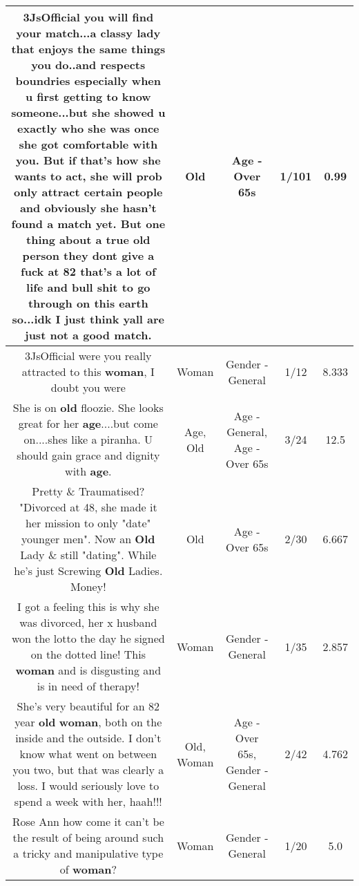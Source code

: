 \documentclass[11pt]{article}
\newlength\mylength
\begin{document}
\begin{center}
\begin{longtable}{|C{.65\mylength}|C{.30\mylength}|C{.12\mylength}|C{.12\mylength}|C{.12\mylength}|}
  \small \@3JsOfficial you will find your match...a classy lady that enjoys the same things you do..and respects boundries especially when u first getting to know someone...but she showed u exactly who she was once she got comfortable with you. But if that's how she wants to act, she will prob only attract certain people and obviously she hasn't found a match yet.  But one thing about a true \textbf{old} person they dont give a fuck at 82 that's a lot of life and bull shit to go through on this earth so...idk I just think yall are just not a good match.\normalsize   & Old & Age - Over 65s & 1/101 & 0.99 \\  \hline
  \small \@3JsOfficial were you really attracted to this \textbf{woman}, I doubt you were\normalsize   & Woman & Gender - General & 1/12 & 8.333 \\  \hline
  \small She is on \textbf{old} floozie.  She looks great for her \textbf{age}....but come on....shes like a piranha.  U should gain grace and dignity with \textbf{age}.\normalsize   & Age, Old & Age - General, Age - Over 65s & 3/24 & 12.5 \\  \hline
  \small Pretty \& Traumatised?  "Divorced at 48, she made it her mission to only "date" younger men". Now an \textbf{Old} Lady \& still "dating". While he's just Screwing \textbf{Old} Ladies. Money!\normalsize   & Old & Age - Over 65s & 2/30 & 6.667 \\  \hline
  \small I got a feeling this is why she was divorced, her x husband won the lotto the day he signed on the dotted line! This \textbf{woman} and is disgusting and is in need of therapy!\normalsize   & Woman & Gender - General & 1/35 & 2.857 \\  \hline
  \small She's very beautiful for an 82 year \textbf{old} \textbf{woman}, both on the inside and the outside. I don't know what went on between you two, but that was clearly a loss. I would seriously love to spend a week with her, haah!!!\normalsize   & Old, Woman & Age - Over 65s, Gender - General & 2/42 & 4.762 \\  \hline
  \small Rose Ann how come it can't be the result of being around such a tricky and manipulative type of \textbf{woman}?\normalsize   & Woman & Gender - General & 1/20 & 5.0 \\  \hline
  
\end{longtable}
\end{center}
\end{document}
